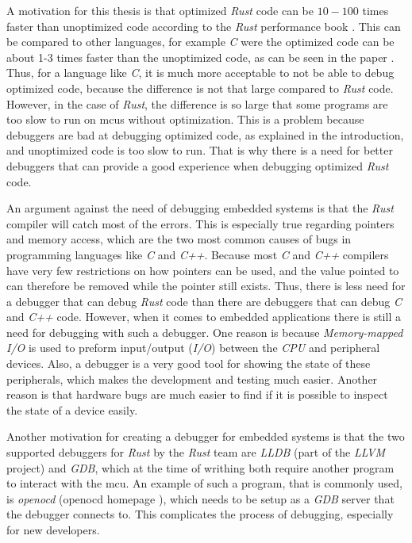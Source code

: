 A motivation for this thesis is that optimized \emph{Rust} code can be $10-100$ times faster than unoptimized code according to the \emph{Rust} performance book \cite{perf-book}.
This can be compared to other languages, for example \emph{C} were the optimized code can be about 1-3 times faster than the unoptimized code, as can be seen in the paper \cite{clang-opt}.
Thus, for a language like \emph{C}, it is much more acceptable to not be able to debug optimized code, because the difference is not that large compared to \emph{Rust} code.
However, in the case of \emph{Rust}, the difference is so large that some programs are too slow to run on \glspl{mcu} without optimization.
This is a problem because debuggers are bad at debugging optimized code, as explained in the introduction, and unoptimized code is too slow to run.
That is why there is a need for better debuggers that can provide a good experience when debugging optimized \emph{Rust} code.


An argument against the need of debugging embedded systems is that the \emph{Rust} compiler will catch most of the errors.
This is especially true regarding pointers and memory access, which are the two most common causes of bugs in programming languages like \emph{C} and \emph{C++}.
Because most \emph{C} and \emph{C++} compilers have very few restrictions on how pointers can be used, and the value pointed to can therefore be removed while the pointer still exists. 
Thus, there is less need for a debugger that can debug \emph{Rust} code than there are debuggers that can debug \emph{C} and \emph{C++} code.
However, when it comes to embedded applications there is still a need for debugging with such a debugger.
One reason is because \emph{Memory-mapped I/O} is used to preform input/output (\emph{I/O}) between the \emph{CPU} and peripheral devices.
Also, a debugger is a very good tool for showing the state of these peripherals, which makes the development and testing much easier.
Another reason is that hardware bugs are much easier to find if it is possible to inspect the state of a device easily.


Another motivation for creating a debugger for embedded systems is that the two supported debuggers for \emph{Rust} by the \emph{Rust} team are \emph{LLDB} (part of the \emph{LLVM} project) and \emph{GDB}, which at the time of writhing both require another program to interact with the \gls{mcu}.
An example of such a program, that is commonly used, is \emph{openocd} (openocd homepage \cite{openocd}), which needs to be setup as a \emph{GDB} server that the debugger connects to.
This complicates the process of debugging, especially for new developers.


